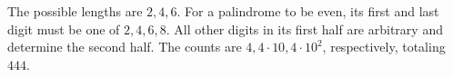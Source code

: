 The possible lengths are $2,4,6$. For a palindrome to be even, its first and last digit must be one of $2,4,6,8$. All other digits in its first half are arbitrary and determine the second half. The counts are $4,4\cdot10,4\cdot10^2$, respectively, totaling $\boxed{444}$.
